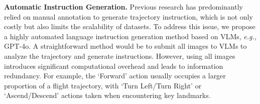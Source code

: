 








\textbf{Automatic Instruction Generation.}
Previous research has predominantly relied on manual annotation to generate trajectory instruction, which is not only costly but also limits the scalability of datasets. To address this issue, we propose a highly automated language instruction generation method based on VLMs, \emph{e.g.,} GPT-4o.
A straightforward method would be to submit all images to VLMs to analyze the trajectory and generate instructions. However, using all images introduces significant computational overhead and leads to information redundancy. For example, the `Forward' action usually occupies a larger proportion of a flight trajectory, with `Turn Left/Turn Right' or `Ascend/Descend' actions taken when encountering key landmarks.




